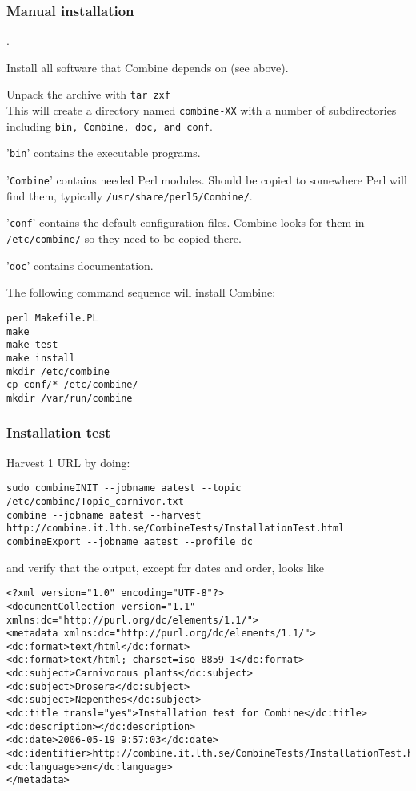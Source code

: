 \subsubsection{Manual installation}

.

Install all software that Combine depends on (see above).

Unpack the archive with {\tt  tar zxf }\\
This will create a directory named {\tt combine-XX} with
a number of subdirectories including {\tt bin, Combine, doc, and conf}.

'{\tt bin}' contains the executable programs.

'{\tt Combine}' contains needed Perl modules. Should be copied to
somewhere Perl will find them, typically {\tt /usr/share/perl5/Combine/}.

'{\tt conf}' contains the default configuration files. Combine looks for them
in {\tt /etc/combine/} so they need to be copied there.

'{\tt doc}' contains documentation.

The following command sequence will install Combine:
\begin{verbatim}
perl Makefile.PL
make
make test
make install
mkdir /etc/combine
cp conf/* /etc/combine/
mkdir /var/run/combine
\end{verbatim}

\subsubsection{Installation test}
Harvest 1 URL by doing:\\
\begin{verbatim}
sudo combineINIT --jobname aatest --topic /etc/combine/Topic_carnivor.txt 
combine --jobname aatest --harvest http://combine.it.lth.se/CombineTests/InstallationTest.html
combineExport --jobname aatest --profile dc
\end{verbatim}
and verify that the output, except for dates and order, looks like\\
\begin{verbatim}
<?xml version="1.0" encoding="UTF-8"?>
<documentCollection version="1.1" xmlns:dc="http://purl.org/dc/elements/1.1/">
<metadata xmlns:dc="http://purl.org/dc/elements/1.1/">
<dc:format>text/html</dc:format>
<dc:format>text/html; charset=iso-8859-1</dc:format>
<dc:subject>Carnivorous plants</dc:subject>
<dc:subject>Drosera</dc:subject>
<dc:subject>Nepenthes</dc:subject>
<dc:title transl="yes">Installation test for Combine</dc:title>
<dc:description></dc:description>
<dc:date>2006-05-19 9:57:03</dc:date>
<dc:identifier>http://combine.it.lth.se/CombineTests/InstallationTest.html</dc:identifier>
<dc:language>en</dc:language>
</metadata>
\end{verbatim}

